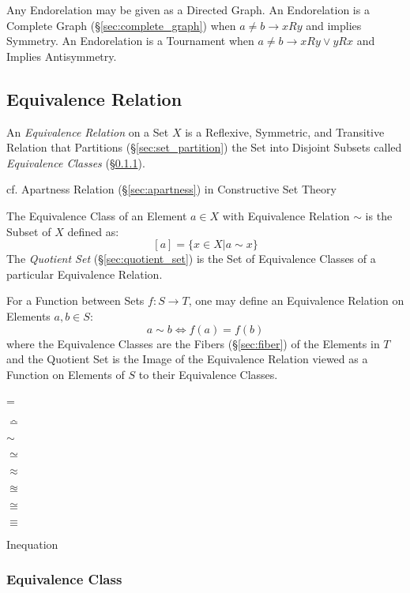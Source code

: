 Any Endorelation may be given as a Directed Graph. An Endorelation is
a Complete Graph (\S\ref{sec:complete_graph}) when $a \neq b
\rightarrow xRy$ and implies Symmetry. An Endorelation is a Tournament
when $a \neq b \rightarrow xRy \vee yRx$ and Implies Antisymmetry.



\subsection{Equivalence Relation}\label{sec:equivalence_relation}

An \emph{Equivalence Relation} on a Set $X$ is a Reflexive, Symmetric,
and Transitive Relation that Partitions (\S\ref{sec:set_partition})
the Set into Disjoint Subsets called \emph{Equivalence Classes}
(\S\ref{sec:equivalence_class}).

cf. Apartness Relation (\S\ref{sec:apartness}) in Constructive Set Theory

The Equivalence Class of an Element $a \in X$ with Equivalence
Relation $\sim$ is the Subset of $X$ defined as:
\[
    [a] = \{x \in X | a \sim x\}
\]
The \emph{Quotient Set} (\S\ref{sec:quotient_set}) is the Set of
Equivalence Classes of a particular Equivalence Relation.

For a Function between Sets $f : S \rightarrow T$, one may define an
Equivalence Relation on Elements $a,b \in S$:
\[
    a \sim b \Leftrightarrow f(a) = f(b)
\]
where the Equivalence Classes are the Fibers (\S\ref{sec:fiber}) of
the Elements in $T$ and the Quotient Set is the Image of the
Equivalence Relation viewed as a Function on Elements of $S$ to their
Equivalence Classes.

=

$\bumpeq$

$\sim$

$\simeq$

$\approx$

$\approxeq$

$\cong$

$\equiv$

Inequation



\subsubsection{Equivalence Class}\label{sec:equivalence_class}

